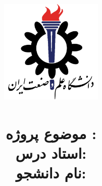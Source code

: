 \title{
    \center
    \includegraphics[width=5cm, height=5cm]{images/IUST_logo_color.png} \\

\CourseName \\[20pt]

موضوع پروژه : 
\PickedSubject  \\

\textbf{استاد درس:}
\Instructor \\[10pt]

\textbf{نام دانشجو:}
\Student
}




\date{\Semester}


